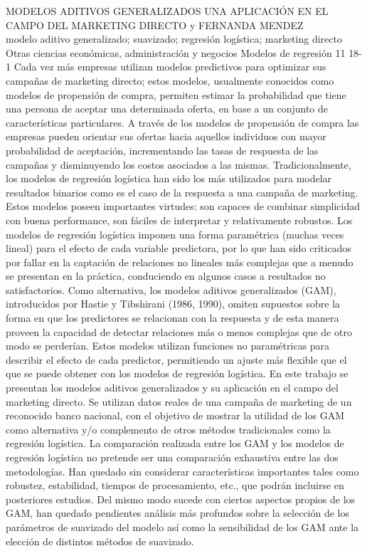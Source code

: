 \A
{MODELOS ADITIVOS GENERALIZADOS UNA APLICACIÓN EN EL CAMPO DEL MARKETING DIRECTO}
{ y FERNANDA MENDEZ}
{
\\}
{modelo aditivo generalizado; suavizado; regresión logística; marketing directo} 
 {Otras ciencias económicas, administración y negocios} 
 {Modelos de regresión} 
 {11} 
 {18-1}
{Cada vez más empresas utilizan modelos predictivos para optimizar sus campañas de marketing directo; estos modelos, usualmente conocidos como modelos de propensión de compra, permiten estimar la probabilidad que tiene una persona de aceptar una determinada oferta, en base a un conjunto de características particulares. A través de los modelos de propensión de compra las empresas pueden orientar sus ofertas hacia aquellos individuos con mayor probabilidad de aceptación, incrementando las tasas de respuesta de las campañas y disminuyendo los costos asociados a las mismas. Tradicionalmente, los modelos de regresión logística han sido los más utilizados para modelar resultados binarios como es el caso de la respuesta a una campaña de marketing. Estos modelos poseen importantes virtudes: son capaces de combinar simplicidad con buena performance, son fáciles de interpretar y relativamente robustos. Los modelos de regresión logística imponen una forma paramétrica (muchas veces lineal) para el efecto de cada variable predictora, por lo que han sido criticados por fallar en la captación de relaciones no lineales más complejas que a menudo se presentan en la práctica, conduciendo en algunos casos a resultados no satisfactorios. Como alternativa, los modelos aditivos generalizados (GAM), introducidos por Hastie y Tibshirani (1986, 1990), omiten supuestos sobre la forma en que los predictores se relacionan con la respuesta y de esta manera proveen la capacidad de detectar relaciones más o menos complejas que de otro modo se perderían. Estos modelos utilizan funciones no paramétricas para describir el efecto de cada predictor, permitiendo un ajuste más flexible que el que se puede obtener con los modelos de regresión logística. En este trabajo se presentan los modelos aditivos generalizados y su aplicación en el campo del marketing directo. Se utilizan datos reales de una campaña de marketing de un reconocido banco nacional, con el objetivo de mostrar la utilidad de los GAM como alternativa y/o complemento de otros métodos tradicionales como la regresión logística. La comparación realizada entre los GAM y los modelos de regresión logística no pretende ser una comparación exhaustiva entre las dos metodologías. Han quedado sin considerar características importantes tales como robustez, estabilidad, tiempos de procesamiento, etc., que podrán incluirse en posteriores estudios. Del mismo modo sucede con ciertos aspectos propios de los GAM, han quedado pendientes análisis más profundos sobre la selección de los parámetros de suavizado del modelo así como la sensibilidad de los GAM ante la elección de distintos métodos de suavizado.}
